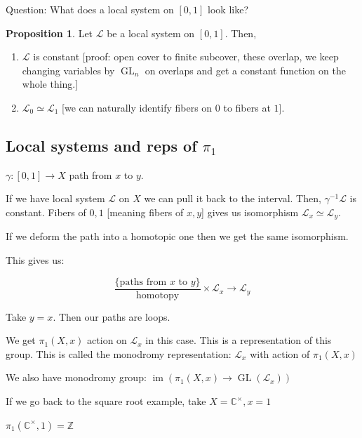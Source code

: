 \documentclass{article}
\theoremstyle{definition}
\newtheorem{proposition}[theorem]{Proposition}
\begin{document}
    Question: What does a local system on \([0,1]\) look like?

    \begin{proposition}
        Let \(\mathcal{L}\) be a local system on \([0,1]\). Then,

        \begin{enumerate}[label=\alph*)]
            \item \(\mathcal{L}\) is constant [proof: open cover to finite subcover, these overlap, we keep changing variables by \(\operatorname{GL}_n\) on overlaps and get a constant function on the whole thing.]
            
            \item \(\mathcal{L}_0 \simeq \mathcal{L}_1\) [we can naturally identify fibers on \(0\) to fibers at \(1\)].
        \end{enumerate} 
    \end{proposition}

    \subsection*{Local systems and reps of \(\pi_1\)}

    \(\gamma: [0,1] \to X\) path from \(x\) to \(y\).

    If we have local system \(\mathcal{L}\) on \(X\) we can pull it back to the interval. Then, \(\gamma ^{-1} \mathcal{L}\) is constant. Fibers of \(0,1\) [meaning fibers of \(x,y\)] gives us isomorphism \(\mathcal{L}_x \simeq \mathcal{L}_y\).

    If we deform the path into a homotopic one then we get the same isomorphism.

    This gives us:

    \[
        \frac{\{ \text{paths from \(x\) to \(y\)}  \}}{\text{homotopy}} \times \mathcal{L}_x \to \mathcal{L}_y
    \]

    Take \(y=x\). Then our paths are loops.

    We get \(\pi_1(X,x)\) action on \(\mathcal{L}_x\) in this case. This is a representation of this group. This is called the monodromy representation: \(\mathcal{L}_x\) with action of \(\pi_1(X,x)\)

    We also have monodromy group: \(\operatorname{im} \left( \pi_1(X,x) \to \operatorname{GL}(\mathcal{L}_x)\right) \) 

    If we go back to the square root example, take \(X=\mathbb{C}^\times, x = 1\)

    \(\pi_1(\mathbb{C}^\times, 1) = \mathbb{Z}\) 
\end{document}
